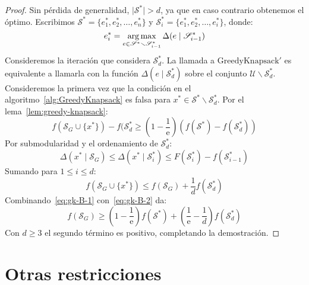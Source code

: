   \begin{proof}
    Sin pérdida de generalidad,
    \(\lvert \mathscr{S}^* \rvert > d\),
    ya que en caso contrario obtenemos el óptimo.
    Escribimos \(\mathscr{S}^* = \{e_1^*, e_2^*, \dotsc, e_n^*\}\)
    y \(\mathscr{S}_i^* = \{e_1^*, e_2^*, \dotsc, e_i^*\}\),
    donde:
    \begin{equation*}
      e_i^*
        = \operatorname*{arg\,max}_{e \in \mathscr{S}^* \smallsetminus \mathscr{S}_{i - 1}^*}
             \Delta(e \mid \mathscr{S}_{i - 1}^* )
    \end{equation*}
    Consideremos la iteración que considera \(\mathscr{S}_d^*\).
    La llamada a \(\mathrm{GreedyKnapsack}'\)
    es equivalente a llamarla con la función \(\Delta(e \mid \mathscr{S}_d^*)\)
    sobre el conjunto \(\mathscr{U} \smallsetminus \mathscr{S}_d^*\).
    Consideremos la primera vez
    que la condición en el algoritmo~\ref{alg:GreedyKnapsack} es falsa
    para \(x^* \in \mathscr{S}^* \smallsetminus \mathscr{S}^*_d\).
    Por el lema~\ref{lem:greedy-knapsack}:
    \begin{equation}
      \label{eq:gk-B-1}
      f(\mathscr{S}_G \cup \{x^*\}) - f(\mathscr{S}_d^*
        \ge \left(1 - \frac{1}{\mathrm{e}}\right)
              (f(\mathscr{S}^*) - f(\mathscr{S}_d^*))
    \end{equation}
    Por submodularidad y el ordenamiento de \(\mathscr{S}_d^*\):
    \begin{equation*}
      \Delta(x^* \mid \mathscr{S}_G)
        \le \Delta(x^* \mid \mathscr{S}_i^*)
        \le F(\mathscr{S}_i^*) - f(\mathscr{S}_{i - 1}^*)
    \end{equation*}
    Sumando para \(1 \le i \le d\):
    \begin{equation}
      \label{eq:gk-B-2}
      f(\mathscr{S}_G \cup \{x^*\})
        \le f(\mathscr{S}_G) + \frac{1}{d} f(\mathscr{S}_d^*)
    \end{equation}
    Combinando~\eqref{eq:gk-B-1} con~\eqref{eq:gk-B-2} da:
    \begin{equation*}
      f(\mathscr{S}_G)
        \ge \left(1 - \frac{1}{\mathrm{e}}\right) f(\mathscr{S}^*)
              + \left(\frac{1}{\mathrm{e}} - \frac{1}{d}\right)
                  f(\mathscr{S}_d^*)
    \end{equation*}
    Con \(d \ge 3\) el segundo término es positivo,
    completando la demostración.
  \end{proof}

\section{Otras restricciones}
\label{sec:submodular-other}

